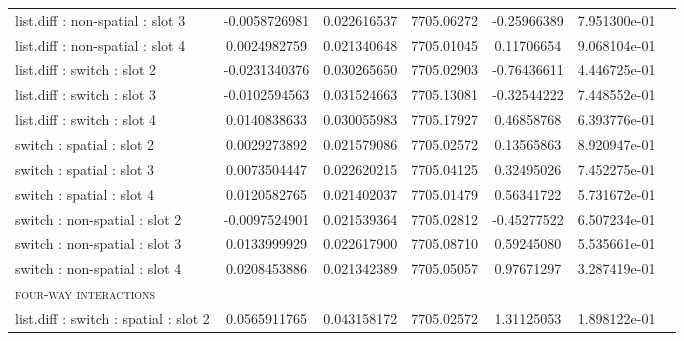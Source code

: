 \begin{center}
\begin{longtable}{l S[table-format=>1.3] S[table-format=1.3] S[table-format=4.1,round-precision=1] S[table-format=>2.2,round-precision=2] S[table-format=>1.3] c }
list.diff : non-spatial : slot 3           & -0.0058726981  &           0.022616537  &            7705.06272  &            -0.25966389  &           7.951300e-01  &         \\
list.diff : non-spatial : slot 4           &  0.0024982759  &           0.021340648  &            7705.01045  &             0.11706654  &           9.068104e-01  &         \\
list.diff : switch : slot 2                & -0.0231340376  &           0.030265650  &            7705.02903  &            -0.76436611  &           4.446725e-01  &         \\
list.diff : switch : slot 3                & -0.0102594563  &           0.031524663  &            7705.13081  &            -0.32544222  &           7.448552e-01  &         \\
list.diff : switch : slot 4                &  0.0140838633  &           0.030055983  &            7705.17927  &             0.46858768  &           6.393776e-01  &         \\
switch : spatial : slot 2                  &  0.0029273892  &           0.021579086  &            7705.02572  &             0.13565863  &           8.920947e-01  &         \\
switch : spatial : slot 3                  &  0.0073504447  &           0.022620215  &            7705.04125  &             0.32495026  &           7.452275e-01  &         \\
switch : spatial : slot 4                  &  0.0120582765  &           0.021402037  &            7705.01479  &             0.56341722  &           5.731672e-01  &         \\
switch : non-spatial : slot 2              & -0.0097524901  &           0.021539364  &            7705.02812  &            -0.45277522  &           6.507234e-01  &         \\
switch : non-spatial : slot 3              &  0.0133999929  &           0.022617900  &            7705.08710  &             0.59245080  &           5.535661e-01  &         \\
switch : non-spatial : slot 4              &  0.0208453886  &           0.021342389  &            7705.05057  &             0.97671297  &           3.287419e-01  &         \\ \midrule
\scshape{four-way interactions}            &                &                        &                        &                         &                         &         \\
list.diff : switch : spatial : slot 2      &  0.0565911765  &           0.043158172  &            7705.02572  &             1.31125053  &           1.898122e-01  &         \\

\end{longtable}
\end{center}
